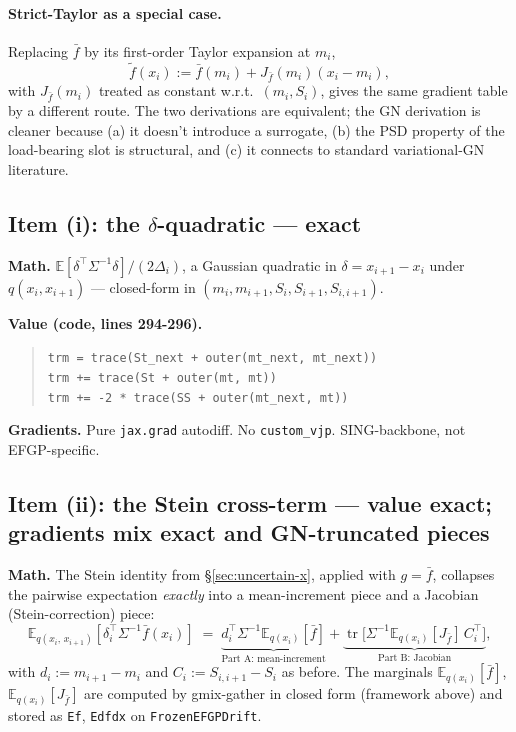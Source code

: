 \documentclass[11pt]{article}
\newcommand{\E}{\mathbb{E}}
\newcommand{\Eqx}{\mathbb{E}_{q(x_i)}}
\newcommand{\Eqxx}{\mathbb{E}_{q(x_i,\,x_{i+1})}}
\newcommand{\tr}{\operatorname{tr}}
\newcommand{\code}[1]{\texttt{\small #1}}
\begin{document}
\paragraph{Strict-Taylor as a special case.}
Replacing $\bar f$ by its first-order Taylor expansion at $m_i$,
\begin{equation}
\widetilde f(x_i) := \bar f(m_i) + J_{\bar f}(m_i)(x_i - m_i),
\label{eq:linearisation}
\end{equation}
with $J_{\bar f}(m_i)$ treated as constant w.r.t.\ $(m_i, S_i)$, gives
the same gradient table by a different route. The two derivations are
equivalent; the GN derivation is cleaner because (a) it doesn't
introduce a surrogate, (b) the PSD property of the load-bearing slot
is structural, and (c) it connects to standard variational-GN
literature.

\subsection*{Item (i): the $\delta$-quadratic --- exact}

\textbf{Math.} $\E[\delta^\top\Sigma^{-1}\delta]/(2\Delta_i)$, a Gaussian
quadratic in $\delta = x_{i+1}-x_i$ under $q(x_i, x_{i+1})$ ---
closed-form in $(m_i, m_{i+1}, S_i, S_{i+1}, S_{i,i+1})$.

\textbf{Value (code, lines 294-296).}
\begin{quote}
\code{trm  = trace(St\_next + outer(mt\_next, mt\_next))} \\
\code{trm += trace(St + outer(mt, mt))} \\
\code{trm += -2 * trace(SS + outer(mt\_next, mt))}
\end{quote}

\textbf{Gradients.} Pure \code{jax.grad} autodiff. No
\code{custom\_vjp}. SING-backbone, not EFGP-specific.

\subsection*{Item (ii): the Stein cross-term --- value exact; gradients mix exact and GN-truncated pieces}
\label{sec:moments}

\textbf{Math.} The Stein identity from §\ref{sec:uncertain-x}, applied
with $g = \bar f$, collapses the pairwise expectation \emph{exactly}
into a mean-increment piece and a Jacobian (Stein-correction) piece:
\begin{equation}
\Eqxx[\delta_i^\top\Sigma^{-1}\bar f(x_i)]
\;=\;
\underbrace{d_i^\top\Sigma^{-1}\Eqx[\bar f]}_{\text{Part A: mean-increment}}
+ \underbrace{\tr\!\bigl[\Sigma^{-1}\Eqx[J_{\bar f}]\,C_i^\top\bigr]}_{\text{Part B: Jacobian}},
\label{eq:Stein-cross}
\end{equation}
with $d_i := m_{i+1}-m_i$ and $C_i := S_{i,i+1}-S_i$ as before. The
marginals $\Eqx[\bar f]$, $\Eqx[J_{\bar f}]$ are computed by
gmix-gather in closed form (framework above) and stored as \code{Ef},
\code{Edfdx} on \code{FrozenEFGPDrift}.
\end{document}
